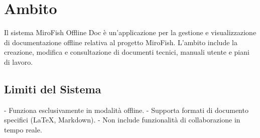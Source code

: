 \section{Ambito}

Il sistema MiroFish Offline Doc è un'applicazione per la gestione e visualizzazione di documentazione offline relativa al progetto MiroFish. L'ambito include la creazione, modifica e consultazione di documenti tecnici, manuali utente e piani di lavoro.

\subsection{Limiti del Sistema}

- Funziona esclusivamente in modalità offline.
- Supporta formati di documento specifici (LaTeX, Markdown).
- Non include funzionalità di collaborazione in tempo reale.